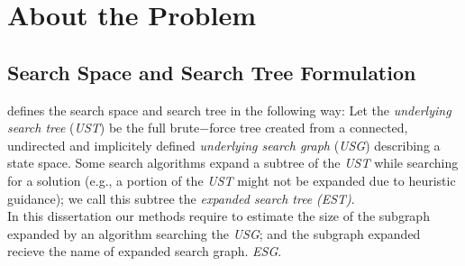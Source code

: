 

\chapter{About the Problem}\label{aboutTheProblem}

\iffalse
\chapterprecis{The purpose of this section if to motivate the problem.}\index{sinopse de capítulo}
\fi

\section{Search Space and Search Tree Formulation}
\cite{lelis2013predicting} defines the search space and search tree in the following way: Let the \textit{underlying search tree} (\textit{UST}) be the full brute$-$force tree created from a connected, undirected and implicitely defined \textit{underlying search graph} (\textit{USG}) describing a state space. Some search algorithms expand a subtree of the \textit{UST} while searching for a solution (\textsf{e.g.,} a portion of the \textit{UST} might not be expanded due to heuristic guidance); we call this subtree the \textit{expanded search tree} \textit{(EST)}.\\

In this dissertation our methods require to estimate the size of the subgraph expanded by an algorithm searching the \textit{USG}; and the subgraph expanded recieve the name of expanded search graph. \textit{ESG}.\\

